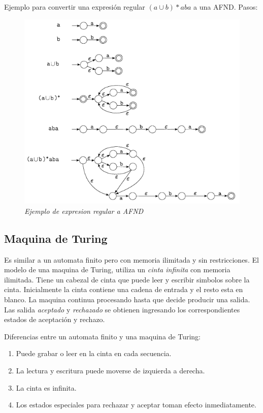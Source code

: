 \documentclass{article}
\begin{document}
Ejemplo para convertir una expresión regular \((a \cup b)*aba\) a una AFND. Pasos:

\begin{figure}[h!]
    \begin{center} 
    \includegraphics[width=\linewidth]{imagenes/ejemplo-expresionregular-AFND.png}
    \caption{\small \sl Ejemplo de expresion regular a AFND} 
    \end{center}
\end{figure}



\newpage
\subsection{Maquina de Turing}

Es similar a un automata finito pero con memoria ilimitada y sin restricciones.
El modelo de una maquina de Turing, utiliza un \textit{cinta infinita} con memoria ilimitada. 
Tiene un cabezal de cinta que puede leer y escribir simbolos sobre la cinta.
Inicialmente la cinta contiene una cadena de entrada y el resto esta en blanco.
La maquina continua procesando hasta que decide producir una salida.
Las salida \textit{aceptado} y \textit{rechazado} se obtienen ingresando los correspondientes 
estados de aceptación y rechazo.


Diferencias entre un automata finito y una maquina de Turing:

\begin{enumerate}
    \item Puede grabar o leer en la cinta en cada secuencia.
    \item La lectura y escritura puede moverse de izquierda a derecha.
    \item La cinta es infinita.
    \item Los estados especiales para rechazar y aceptar toman efecto inmediatamente. 
\end{enumerate}
\end{document}
